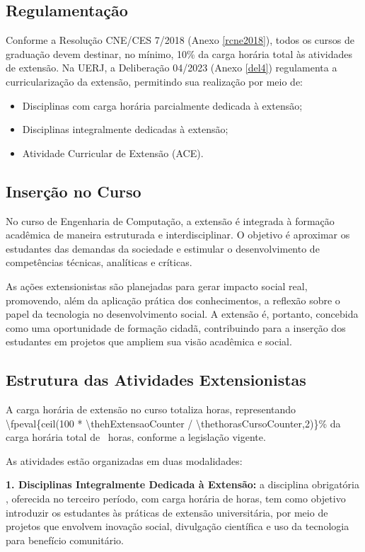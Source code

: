 \subsection{Regulamentação}
Conforme a Resolução CNE/CES  7/2018 (Anexo \ref{rcne2018}), todos os cursos de graduação devem destinar, no mínimo, 10\% da carga horária total às atividades de extensão. Na UERJ, a Deliberação  04/2023 (Anexo \ref{del4}) regulamenta a curricularização da extensão, permitindo sua realização por meio de:

\begin{itemize}
    \item Disciplinas com carga horária parcialmente dedicada à extensão;
    \item Disciplinas integralmente dedicadas à extensão;
    \item Atividade Curricular de Extensão (ACE).
\end{itemize}

\subsection{Inserção no Curso}

No curso de Engenharia de Computação, a extensão é integrada à formação acadêmica de maneira estruturada e interdisciplinar. O objetivo é aproximar os estudantes das demandas da sociedade e estimular o desenvolvimento de competências técnicas, analíticas e críticas.

As ações extensionistas são planejadas para gerar impacto social real, promovendo, além da aplicação prática dos conhecimentos, a reflexão sobre o papel da tecnologia no desenvolvimento social. A extensão é, portanto, concebida como uma oportunidade de formação cidadã, contribuindo para a inserção dos estudantes em projetos que ampliem sua visão acadêmica e social.

\subsection{Estrutura das Atividades Extensionistas}

A carga horária de extensão no curso totaliza \hExtensao horas, representando \num{\fpeval{ceil(100 * \thehExtensaoCounter / \thethorasCursoCounter,2)}}\% da carga horária total de \tHorasCurso\ horas, conforme a legislação vigente.

As atividades estão organizadas em duas modalidades:

\textbf{1. Disciplinas Integralmente Dedicada à Extensão:}
a disciplina obrigatória \textbf{\Ext}, oferecida no terceiro período, com carga horária de \ExtCH{ } horas, tem como objetivo introduzir os estudantes às práticas de extensão universitária, por meio de projetos que envolvem inovação social, divulgação científica e uso da tecnologia para benefício comunitário.

